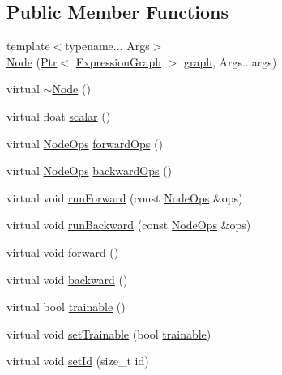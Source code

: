 \subsection*{Public Member Functions}
\begin{DoxyCompactItemize}
\item 
{\footnotesize template$<$typename... Args$>$ }\\\hyperlink{classmarian_1_1Node_ab2576bb59c9c4d52bb2f676bb848ebc5}{Node} (\hyperlink{namespacemarian_ad1a373be43a00ef9ce35666145137b08}{Ptr}$<$ \hyperlink{classmarian_1_1ExpressionGraph}{Expression\+Graph} $>$ \hyperlink{classmarian_1_1Node_a6a95b0e641febd5f2893e8982f497735}{graph}, Args...\+args)
\item 
virtual \hyperlink{classmarian_1_1Node_a67ea4aa875ae1fe2143ac9e4dae75c73}{$\sim$\+Node} ()
\item 
virtual float \hyperlink{classmarian_1_1Node_a078122f6a9c2df448139780a1e3a323b}{scalar} ()
\item 
virtual \hyperlink{namespacemarian_a4956376218cc236016c20bc4071470da}{Node\+Ops} \hyperlink{classmarian_1_1Node_a13a2bc9bdc100205606bbd01acecb659}{forward\+Ops} ()
\item 
virtual \hyperlink{namespacemarian_a4956376218cc236016c20bc4071470da}{Node\+Ops} \hyperlink{classmarian_1_1Node_a783915262a9d7af81372c8f0a8363beb}{backward\+Ops} ()
\item 
virtual void \hyperlink{classmarian_1_1Node_a2ca87895ccb70368ff3c7168816c860c}{run\+Forward} (const \hyperlink{namespacemarian_a4956376218cc236016c20bc4071470da}{Node\+Ops} \&ops)
\item 
virtual void \hyperlink{classmarian_1_1Node_a7738def79b94994bd20cf8762ff2fd0c}{run\+Backward} (const \hyperlink{namespacemarian_a4956376218cc236016c20bc4071470da}{Node\+Ops} \&ops)
\item 
virtual void \hyperlink{classmarian_1_1Node_a0ace1579b496977ac75fadfffc41416b}{forward} ()
\item 
virtual void \hyperlink{classmarian_1_1Node_a4710c71a35130cf0e382bb0a430725d3}{backward} ()
\item 
virtual bool \hyperlink{classmarian_1_1Node_a924457f1be4e8f51fc563118185e3e83}{trainable} ()
\item 
virtual void \hyperlink{classmarian_1_1Node_a04b5aa3633d6a01b074f59fd93d7fb15}{set\+Trainable} (bool \hyperlink{classmarian_1_1Node_a924457f1be4e8f51fc563118185e3e83}{trainable})
\item 
virtual void \hyperlink{classmarian_1_1Node_ab40b40d8c7e00d1dd1ac9f69e3e510f4}{set\+Id} (size\+\_\+t id)

\end{DoxyCompactItemize}
